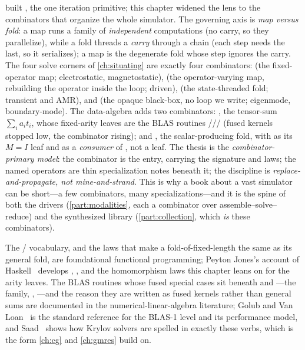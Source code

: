 \summarysection
{} built , the one iteration primitive; this
chapter widened the lens to the combinators that organize the whole simulator. The
governing axis is \emph{map versus fold}: a map runs a family of \emph{independent}
computations (no carry, so they parallelize), while a fold threads a \emph{carry}
through a chain (each step needs the last, so it serializes); a map is the
degenerate fold whose step ignores the carry. The four solve corners of
\cref{ch:situating} are exactly four combinators:  (the
fixed-operator map; electrostatic, magnetostatic),  (the
operator-varying map, rebuilding the operator inside the loop; driven),
 (the state-threaded fold; transient and AMR), and 
(the opaque black-box, no loop we write; eigenmode, boundary-mode). The
data-algebra adds two combinators: , the tensor-sum
$\sum_i a_i t_i$, whose fixed-arity leaves are the BLAS routines
/// (fused kernels stopped low,
the combinator rising); and , the scalar-producing fold, with
 as its $M = I$ leaf and  as a \emph{consumer} of ,
not a leaf. The thesis is the \emph{combinator-primary model}: the combinator is
the entry, carrying the signature and laws; the named operators are thin
specialization notes beneath it; the discipline is \emph{replace-and-propagate, not
mine-and-strand}. This is why a book about a vast simulator can be short---a few
combinators, many specializations---and it is the spine of both the drivers
(\cref{part:modalities}, each a combinator over assemble--solve--reduce) and the
synthesized library (\cref{part:collection}, which \emph{is} these combinators).

\furtherreading
The / vocabulary, and the laws that make a fold-of-fixed-length
the same as its general fold, are foundational functional programming; Peyton
Jones's account of Haskell~\citep{peytonjones2003} develops , ,
and the homomorphism laws this chapter leans on for the arity leaves. The BLAS
routines whose fused special cases sit beneath  and
---the  family, , ---and the
reason they are written as fused kernels rather than general sums are documented in
the numerical-linear-algebra literature; Golub and Van Loan~\citep{golubvanloan2013}
is the standard reference for the BLAS-1 level and its performance model, and
Saad~\citep{saad2003} shows how Krylov solvers are spelled in exactly these verbs,
which is the form \cref{ch:cg} and \cref{ch:gmres} build on.

